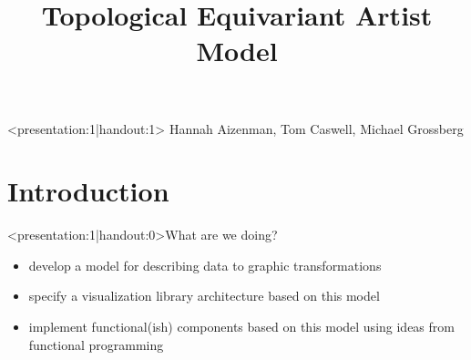 \documentclass[xcolor={dvipsnames}]{beamer}
\begin{document}
\title{Topological Equivariant Artist Model}

\begin{frame}<presentation:1|handout:1>
	\titlepage
    Hannah Aizenman, Tom Caswell, Michael Grossberg\\
\end{frame}

\section{Introduction}
\begin{frame}<presentation:1|handout:0>{What are we doing?}
    \begin{itemize}
        \item develop a model for describing data to graphic transformations
        \item specify a visualization library architecture based on this model
        \item implement functional(ish) components based on this model using ideas from functional programming
    \end{itemize}
\end{frame}
\end{document}
